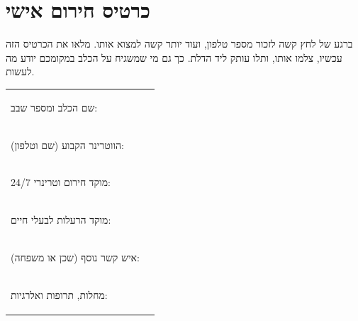 \section{כרטיס חירום אישי}
ברגע של לחץ קשה לזכור מספר טלפון, ועוד יותר קשה למצוא אותו. מלאו את הכרטיס הזה עכשיו, צלמו
אותו, ותלו עותק ליד הדלת. כך גם מי שמשגיח על הכלב במקומכם יודע מה לעשות.

\begin{tcolorbox}[enhanced,colback=white,colframe=alert,arc=3mm,boxrule=1pt,
   title={\sffamily\bfseries\medicon\enspace כרטיס החירום של הכלב שלי},colbacktitle=alert,
   left=10pt,right=10pt,top=6pt,bottom=6pt]
\renewcommand{\arraystretch}{1.9}
\begin{tabularx}{\linewidth}{>{\sffamily\bfseries\raggedright}m{5.4cm} X}
שם הכלב ומספר שבב: & \dotfill \\
הווטרינר הקבוע (שם וטלפון): & \dotfill \\
מוקד חירום וטרינרי 24/7: & \dotfill \\
מוקד הרעלות לבעלי חיים: & \dotfill \\
איש קשר נוסף (שכן או משפחה): & \dotfill \\
מחלות, תרופות ואלרגיות: & \dotfill \\
\end{tabularx}
\end{tcolorbox}
